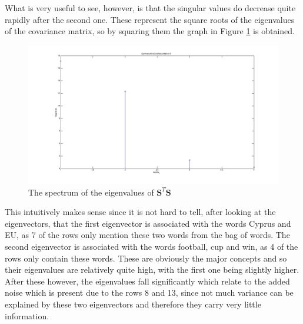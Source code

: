\documentclass[11pt,a4paper]{article}
\begin{document}
What is very useful to see, however, is that the singular values do decrease quite rapidly after the second one. These represent the square roots of the eigenvalues of the covariance matrix, so by squaring them the graph in Figure \ref{spectrum} is obtained.

\begin{figure}[H]
\centering
\includegraphics[scale=0.3]{Spectrum_Eigenvalues.jpg}
\caption{The spectrum of the eigenvalues of $\mathbf{S}^T\mathbf{S}$}
\label{spectrum}
\end{figure}

This intuitively makes sense since it is not hard to tell, after looking at the eigenvectors, that the first eigenvector is associated with the words Cyprus and EU, as 7 of the rows only mention these two words from the bag of words. The second eigenvector is associated with the words football, cup and win, as 4 of the rows only contain these words. These are obviously the major concepts and so their eigenvalues are relatively quite high, with the first one being slightly higher. After these however, the eigenvalues fall significantly which relate to the added noise which is present due to the rows 8 and 13, since not much variance can be explained by these two eigenvectors and therefore they carry very little information. 
\end{document}
